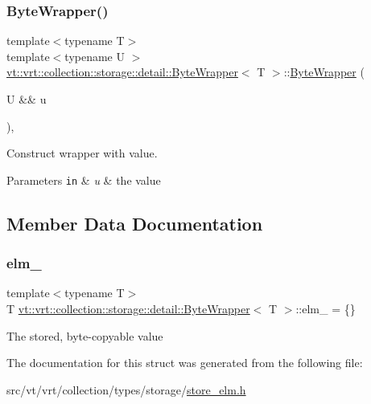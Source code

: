 \subsubsection{\texorpdfstring{Byte\+Wrapper()}{ByteWrapper()}\hspace{0.1cm}{\footnotesize\ttfamily [2/2]}}
{\footnotesize\ttfamily template$<$typename T$>$ \\
template$<$typename U $>$ \\
\hyperlink{structvt_1_1vrt_1_1collection_1_1storage_1_1detail_1_1_byte_wrapper}{vt\+::vrt\+::collection\+::storage\+::detail\+::\+Byte\+Wrapper}$<$ T $>$\+::\hyperlink{structvt_1_1vrt_1_1collection_1_1storage_1_1detail_1_1_byte_wrapper}{Byte\+Wrapper} (\begin{DoxyParamCaption}\item[{U \&\&}]{u }\end{DoxyParamCaption})\hspace{0.3cm}{\ttfamily [inline]}, {\ttfamily [explicit]}}



Construct wrapper with value. 


\begin{DoxyParams}[1]{Parameters}
\mbox{\tt in}  & {\em u} & the value \\
\hline
\end{DoxyParams}


\subsection{Member Data Documentation}
\mbox{\label{structvt_1_1vrt_1_1collection_1_1storage_1_1detail_1_1_byte_wrapper_a096426db91a09454dcddc22686eb755d}} 
\subsubsection{\texorpdfstring{elm\+\_\+}{elm\_}}
{\footnotesize\ttfamily template$<$typename T$>$ \\
T \hyperlink{structvt_1_1vrt_1_1collection_1_1storage_1_1detail_1_1_byte_wrapper}{vt\+::vrt\+::collection\+::storage\+::detail\+::\+Byte\+Wrapper}$<$ T $>$\+::elm\+\_\+ = \{\}}

The stored, byte-\/copyable value 

The documentation for this struct was generated from the following file\+:\begin{DoxyCompactItemize}
\item 
src/vt/vrt/collection/types/storage/\hyperlink{store__elm_8h}{store\+\_\+elm.\+h}\end{DoxyCompactItemize}

